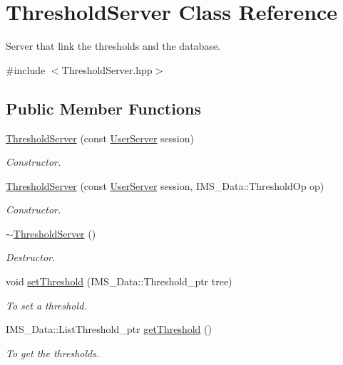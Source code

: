 \hypertarget{classThresholdServer}{
\section{ThresholdServer Class Reference}
\label{classThresholdServer}
}


Server that link the thresholds and the database.  




{\ttfamily \#include $<$ThresholdServer.hpp$>$}

\subsection*{Public Member Functions}
\begin{DoxyCompactItemize}
\item 
\hyperlink{classThresholdServer_a14f5953a7fd2d049e01b949dd1c98369}{ThresholdServer} (const \hyperlink{classUserServer}{UserServer} session)
\begin{DoxyCompactList}\small\item\em Constructor. \item\end{DoxyCompactList}\item 
\hyperlink{classThresholdServer_a068807807db72b6e7b1be4578773e70c}{ThresholdServer} (const \hyperlink{classUserServer}{UserServer} session, IMS\_\-Data::ThresholdOp op)
\begin{DoxyCompactList}\small\item\em Constructor. \item\end{DoxyCompactList}\item 
\hypertarget{classThresholdServer_a39a35ed3f8dd28befff922f9e04cce2f}{
\hyperlink{classThresholdServer_a39a35ed3f8dd28befff922f9e04cce2f}{$\sim$ThresholdServer} ()}
\label{classThresholdServer_a39a35ed3f8dd28befff922f9e04cce2f}

\begin{DoxyCompactList}\small\item\em Destructor. \item\end{DoxyCompactList}\item 
void \hyperlink{classThresholdServer_af2ced48c09e928b0385cfa21e3f15e4b}{setThreshold} (IMS\_\-Data::Threshold\_\-ptr tree)
\begin{DoxyCompactList}\small\item\em To set a threshold. \item\end{DoxyCompactList}\item 
IMS\_\-Data::ListThreshold\_\-ptr \hyperlink{classThresholdServer_a8b0a922ae428b6de5f2940d889801b6e}{getThreshold} ()
\begin{DoxyCompactList}\small\item\em To get the thresholds. \item\end{DoxyCompactList}\end{DoxyCompactItemize}
